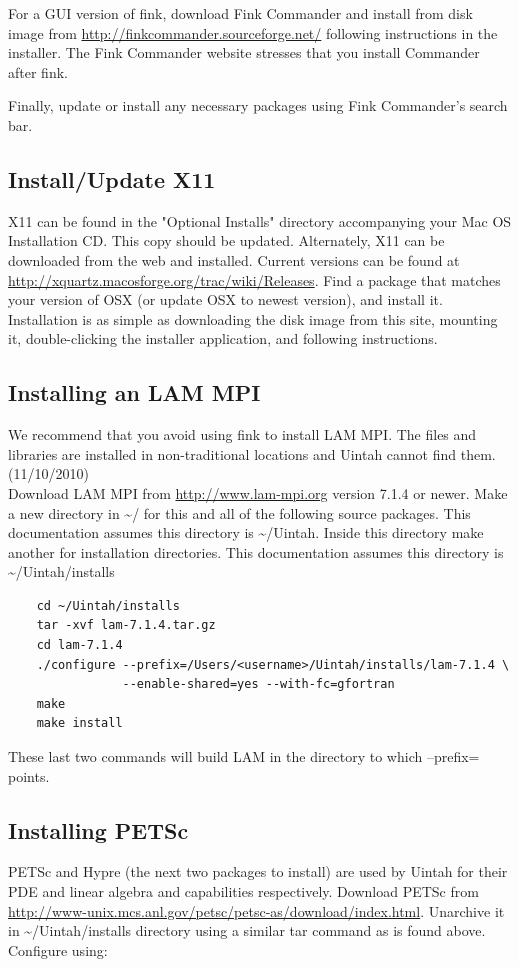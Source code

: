 \documentclass[12pt]{article}
\begin{document}
For a GUI version of fink, download Fink Commander and install from
disk image from \url{http://finkcommander.sourceforge.net/} following
instructions in the installer.  The Fink Commander website stresses
that you install Commander after fink.

Finally, update or install any necessary packages using Fink
Commander's search bar.

\subsection{Install/Update X11}
X11 can be found in the "Optional Installs" directory accompanying
your Mac OS Installation CD.  This copy should be updated.
Alternately, X11 can be downloaded from the web and installed.
Current versions can be found at
\url{http://xquartz.macosforge.org/trac/wiki/Releases}.  Find a
package that matches your version of OSX (or update OSX to newest
version), and install it.  Installation is as simple as downloading
the disk image from this site, mounting it, double-clicking the
installer application, and following instructions.

\subsection{Installing an LAM MPI}
We recommend that you avoid using fink to install LAM MPI.
The files and libraries are installed in non-traditional locations 
and Uintah cannot find them. (11/10/2010) \\

Download LAM MPI from \url{http://www.lam-mpi.org}
version 7.1.4 or newer.  Make a new directory in \textasciitilde/ for
this and all of the following source packages.  This documentation
assumes this directory is \textasciitilde/Uintah.  Inside this
directory make another for installation directories.  This
documentation assumes this directory is
\textasciitilde/Uintah/installs

\begin{verbatim}
	cd ~/Uintah/installs
	tar -xvf lam-7.1.4.tar.gz
	cd lam-7.1.4
	./configure --prefix=/Users/<username>/Uintah/installs/lam-7.1.4 \
	            --enable-shared=yes --with-fc=gfortran
	make
	make install
\end{verbatim}

These last two commands will build LAM in the directory to which
--prefix= points.

\subsection{Installing PETSc}
PETSc and Hypre (the next two packages to install) are used by Uintah
for their PDE and linear algebra and capabilities respectively.
Download PETSc from
\url{http://www-unix.mcs.anl.gov/petsc/petsc-as/download/index.html}.
Unarchive it in \textasciitilde/Uintah/installs directory using a
similar tar command as is found above.  Configure using:
\end{document}
